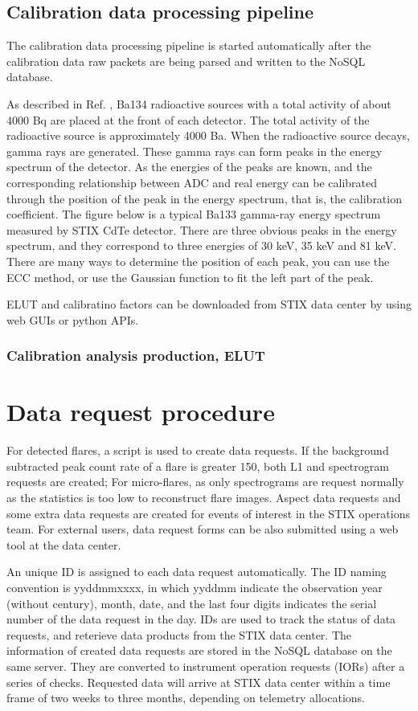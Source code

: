 \documentclass{aa}
\begin{document}
\subsection{Calibration data processing pipeline}
The calibration data processing pipeline is started automatically after the calibration data raw packets
are being parsed and written to the NoSQL database.


As described in Ref. \cite{StixInstrument},  Ba134 radioactive sources with a total activity of about 4000 Bq are placed at the front of each detector. The total activity of the radioactive source is approximately 4000 Ba.
When the radioactive source decays, gamma rays are generated. These gamma rays can form peaks in the energy spectrum of the detector.
As the energies of the peaks are known, and the corresponding relationship between ADC and real energy can be calibrated through the position of the peak in the energy spectrum, that is, the calibration coefficient. The figure below is a typical Ba133 gamma-ray energy spectrum measured by STIX CdTe detector. There are three obvious peaks in the energy spectrum, and they correspond to three energies of 30 keV, 35 keV and 81 keV. There are many ways to determine the position of each peak, you can use the ECC method, or use the Gaussian function to fit the left part of the peak.


ELUT and calibratino factors can be downloaded from STIX data center by using web GUIs or python APIs.
\subsubsection{Calibration analysis production, ELUT}

\section{Data request procedure}

For detected flares,  a script is used to create data requests.
If the background subtracted peak count rate of a flare is greater 150,
both L1 and spectrogram requests are created;  For micro-flares, as only
spectrograms are request normally as the statistics is too
low to reconstruct flare images.  Aspect data requests
and some extra data requests are created for events of interest in the
STIX operations team.
For external users, data request forms can be also submitted using a web tool
at the data center.

An unique ID is assigned to each data request automatically.
The ID naming convention is yyddmmxxxx, in which yyddmm indicate the observation year (without century), month, date,
and the last four digits indicates the serial number of the data request in the day.
IDs are used to track the status of data requests, and reterieve data products from the
STIX data center.
The information of created data requests are stored in the NoSQL database on the same server.
They are converted to instrument operation requests (IORs) after a series of checks.
Requested data will arrive at STIX data center within a time frame of two weeks to three months, depending on
telemetry allocations.
\end{document}
